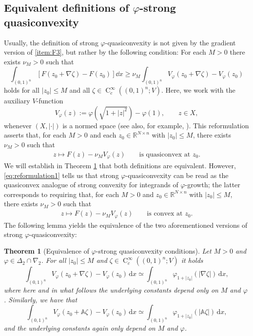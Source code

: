 \documentclass[a4paper,11pt]{amsart}
\numberwithin{equation}{section}
\newcommand{\R}{\mathbb{R}}
\newcommand{\hold}{\operatorname{C}}
\newtheorem{satz}[defi]{Theorem}
\begin{document}
	\subsection{Equivalent definitions of $\varphi$-strong quasiconvexity}
	Usually, the definition of strong $\varphi$-quasiconvexity is not given by the gradient version of \ref{item:F3}, but rather by the following condition: For each $M>0$ there exists $\nu_{M}>0$ such that 
	\begin{equation}
		\int_{(0,1)^n} \left[ F(z_0 + \nabla \zeta) - F(z_0) \right] \dd{x} \geq \nu_{M} \label{eq:q2} \int_{(0,1)^n} V_\varphi(z_0 + \nabla \zeta) - V_\varphi(z_0)
	\end{equation}
	holds for all $|z_{0}|\leq M$ and all $\zeta\in\hold_{c}^{\infty}((0,1)^{n};V)$. Here, we work with the auxiliary $V$-function
	$$V_\varphi(z) := \varphi\left(\sqrt{1+|z|^2} \right) - \varphi(1),\qquad z\in X,$$ whenever $(X,|\cdot|)$ is a normed space (see also, for example, \cite{ carozza_partial_1998, contiFXG, Irving2021partial, schmidt1, schmidt_regularity_2009}). This reformulation asserts that, for each $M>0$ and each $z_{0}\in\R^{N\times n}$ with $|z_{0}|\leq M$, there exists $\nu_{M}>0$ such that 
	\begin{align}\label{eq:reformulation1}
		z\mapsto F(z)-\nu_{M}V_{\varphi}(z)\qquad \text{is quasiconvex at $z_{0}$}. 
	\end{align}
	We will establish in Theorem \ref{lem:quasiconvex} that both definitions are equivalent. However, \eqref{eq:reformulation1} tells us that strong $\varphi$-quasiconvexity can be read as the quasiconvex analogue of strong convexity for integrands of $\varphi$-growth; the latter corresponds to requiring that, for each $M>0$ and $z_{0}\in\R^{N\times n}$ with $|z_{0}|\leq M$, there exists $\nu_{M}>0$ such that 
	\begin{align*}
		z\mapsto F(z)-\nu_{M}V_{\varphi}(z)\qquad\text{is convex at $z_{0}$}.
	\end{align*} 
	The following lemma yields the equivalence of the two aforementioned versions of strong $\varphi$-quasiconvexity: 
	\begin{satz}[Equivalence of $\varphi$-strong quasiconvexity conditions] \label{lem:quasiconvex}
		Let $M>0$ and $\varphi \in \Delta_2 \cap \nabla_2$. For all $|z_0| \leq M$ and $\zeta \in \hold_c^\infty((0,1)^n; V)$ it holds
		\[
		\int_{(0,1)^n} V_\varphi(z_0 + \nabla \zeta) - V_\varphi(z_0) \, \mathrm{d}x \simeq  \int_{(0,1)^n} \varphi_{1+|z_0|}(|\nabla \zeta|) \, \mathrm{d}x,
		\]
		where here and in what follows the underlying constants depend only on $M$ and $\varphi$. Similarly, we have that
		\[
		\int_{(0,1)^n} V_\varphi(z_0 + \mathbb{A}\zeta) - V_\varphi(z_0) \, \mathrm{d}x \simeq  \int_{(0,1)^n} \varphi_{1+|z_0|}(|\mathbb{A} \zeta|) \, \mathrm{d}x, 
		\]
		and the underlying constants again only depend on $M$ and $\varphi$.
	\end{satz}
\end{document}
